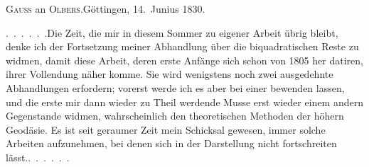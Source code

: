 \begin{center}
\textsc{Gauss} an \textsc{Olbers}.\quad Göttingen, 14.~Junius 1830.
\end{center}

\par\noindent\hspace*{\parindent}\mbox{.\ .\ .\ .\ .\ .}\quad Die Zeit, die mir in diesem Sommer zu eigener Arbeit übrig bleibt, denke ich der Fortsetzung meiner Abhandlung über die biquadratischen Reste zu widmen, damit diese Arbeit, deren erste Anfänge sich schon von 1805 her datiren, ihrer Vollendung näher komme.
Sie wird wenigstens noch zwei ausgedehnte Abhandlungen erfordern; vorerst werde ich es aber bei einer bewenden lassen, und die erste mir dann wieder zu Theil werdende Musse erst wieder einem andern Gegenstande widmen, wahrscheinlich den theoretischen Methoden der höhern Geodäsie.
Es ist seit geraumer Zeit mein Schicksal gewesen, immer solche Arbeiten aufzunehmen, bei denen sich in der Darstellung nicht  fortschreiten lässt.\quad\mbox{.\ .\ .\ .\ .\ .}
